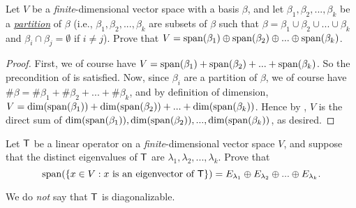 \begin{exercise} \label{exercise 5.2.22}
Let \(V\) be a \emph{finite}-dimensional vector space with a basis \(\beta\), and let \(\beta_1, \beta_2, ..., \beta_k\) be a \href{https://www.wikiwand.com/en/Partition_of_a_set}{\emph{partition}} of \(\beta\)
(i.e., \(\beta_1, \beta_2, ..., \beta_k\) are subsets of \(\beta\) such that \(\beta = \beta_1 \cup \beta_2 \cup ... \cup \beta_k\) and \(\beta_i \cap \beta_j = \emptyset\) if \(i \ne j\)).
Prove that \(V = \operatorname{span}(\beta_1) \oplus \operatorname{span}(\beta_2) \oplus ... \oplus \operatorname{span}(\beta_k)\).
\end{exercise}

\begin{proof}
First, we of course have \(V = \operatorname{span}(\beta_1) + \operatorname{span}(\beta_2) + ... + \operatorname{span}(\beta_k)\).
So the precondition of  is satisfied.
Now, since \(\beta_i\) are a partition of \(\beta\), we of course have \(\#\beta = \#\beta_1 + \#\beta_2 + ... + \#\beta_k\), and by definition of dimension, \(V = \dim(\operatorname{span}(\beta_1)) + \dim(\operatorname{span}(\beta_2)) + ... + \dim(\operatorname{span}(\beta_k))\).
Hence by , \(V\) is the direct sum of \(\dim(\operatorname{span}(\beta_1)), \dim(\operatorname{span}(\beta_2)), ..., \dim(\operatorname{span}(\beta_k))\), as desired.
\end{proof}

\begin{exercise} \label{exercise 5.2.23}
Let \(\textsf{T}\) be a linear operator on a \emph{finite}-dimensional vector space \(V\), and suppose that the distinct eigenvalues of \(\textsf{T}\) are \(\lambda_1, \lambda_2, ..., \lambda_k\).
Prove that
\[
    \operatorname{span}(\{ x \in V: x \text{ is an eigenvector of } \textsf{T} \}) = E_{\lambda_1} \oplus E_{\lambda_2} \oplus ... \oplus E_{\lambda_k}.
\]
\end{exercise}

\begin{note}
We do \emph{not} say that \(\textsf{T}\) is diagonalizable.
\end{note}

